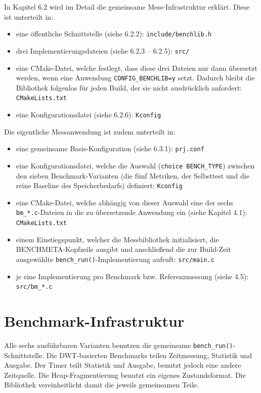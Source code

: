 In Kapitel 6.2 wird im Detail die gemeinsame Mess-Infrastruktur erkl{\"a}rt. Diese ist unterteilt in:

\begin{itemize}
\item eine {\"o}ffentliche Schnittstelle (siehe 6.2.2): \lstinline[style=codeinline]|include/benchlib.h|
\item drei Implementierungsdateien (siehe 6.2.3 -- 6.2.5): \lstinline[style=codeinline]|src/|
\item eine CMake-Datei, welche festlegt, dass diese drei Dateien nur dann {\"u}bersetzt werden, wenn eine Anwendung \lstinline[style=codeinline]|CONFIG_BENCHLIB=y| setzt. Dadurch bleibt die Bibliothek folgenlos f{\"u}r jeden Build, der sie nicht ausdr{\"u}cklich anfordert: \lstinline[style=codeinline]|CMakeLists.txt|
\item eine Konfigurationsdatei (siehe 6.2.6): \lstinline[style=codeinline]|Kconfig|
\end{itemize}
Die eigentliche Messanwendung ist zudem unterteilt in:

\begin{itemize}
\item eine gemeinsame Basis-Konfiguration (siehe 6.3.1): \lstinline[style=codeinline]|prj.conf|
\item eine Konfigurationsdatei, welche die Auswahl (\lstinline[style=codeinline]|choice BENCH_TYPE|) zwischen den sieben Benchmark-Varianten (die f{\"u}nf Metriken, der Selbsttest und die reine Baseline des Speicherbedarfs) definiert: \lstinline[style=codeinline]|Kconfig|
\item eine CMake-Datei, welche abh{\"a}ngig von dieser Auswahl eine der sechs \lstinline[style=codeinline]|bm_*.c|-Dateien in die zu {\"u}bersetzende Anwendung ein (siehe Kapitel 4.1): \lstinline[style=codeinline]|CMakeLists.txt|
\item einem Einstiegspunkt, welcher die Messbibliothek initialisiert, die BENCHMETA-Kopfzeile ausgibt und anschlie{\ss}end die zur Build-Zeit ausgew{\"a}hlte \lstinline[style=codeinline]|bench_run()|-Implementierung aufruft: \lstinline[style=codeinline]|src/main.c|
\item je eine Implementierung pro Benchmark bzw. Referenzmessung (siehe 4.5): \lstinline[style=codeinline]|src/bm_*.c|
\end{itemize}
\section{Benchmark-Infrastruktur}
Alle sechs ausf{\"u}hrbaren Varianten benutzen die gemeinsame \lstinline[style=codeinline]|bench_run()|-Schnittstelle. Die DWT-basierten Benchmarks teilen Zeitmessung, Statistik und Ausgabe. Der Timer teilt Statistik und Ausgabe, benutzt jedoch eine andere Zeitquelle. Die Heap-Fragmentierung benutzt ein eigenes Zustandsformat. Die Bibliothek vereinheitlicht damit die jeweils gemeinsamen Teile.

